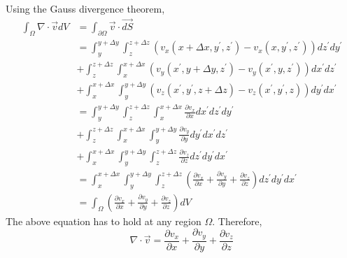 \documentclass[letterpaper, 12pt]{article}
\theoremstyle{custom}
\begin{document}
Using the Gauss divergence theorem,
\begin{align*}
  \int_{\Omega} \nabla \cdot \vec{v} dV 
  &= \int_{\partial \Omega} \vec{v} \cdot \vec{dS}\\
  &= \int_{y}^{y+\Delta y} \int_{z}^{z+\Delta z} \left( v_x (x+\Delta x, y^{\prime}, z^{\prime}) - v_x (x, y^{\prime}, z^{\prime}) \right) dz^{\prime} dy^{\prime}\\
  &+ \int_{z}^{z+\Delta z} \int_{x}^{x+\Delta x} \left( v_y (x^{\prime}, y+\Delta y, z^{\prime}) - v_y (x^{\prime}, y, z^{\prime}) \right) dx^{\prime} dz^{\prime}\\
  &+ \int_{x}^{x+\Delta x} \int_{y}^{y+\Delta y} \left( v_z (x^{\prime}, y^{\prime}, z+\Delta z) - v_z (x^{\prime}, y^{\prime}, z) \right) dy^{\prime} dx^{\prime}\\
  &= \int_{y}^{y+\Delta y} \int_{z}^{z+\Delta z} \int_{x}^{x+\Delta x} \frac{\partial v_x}{\partial x} dx^{\prime} dz^{\prime} dy^{\prime}\\
  &+ \int_{z}^{z+\Delta z} \int_{x}^{x+\Delta x} \int_{y}^{y+\Delta y} \frac{\partial v_y}{\partial y} dy^{\prime} dx^{\prime} dz^{\prime}\\
  &+ \int_{x}^{x+\Delta x} \int_{y}^{y+\Delta y} \int_{z}^{z+\Delta z} \frac{\partial v_z}{\partial z} dz^{\prime} dy^{\prime} dx^{\prime}\\
  &= \int_{x}^{x+\Delta x} \int_{y}^{y+\Delta y} \int_{z}^{z+\Delta z} \left( \frac{\partial v_x}{\partial x} + \frac{\partial v_y}{\partial y} + \frac{\partial v_z}{\partial z} \right) dz^{\prime} dy^{\prime} dx^{\prime}\\
  &= \int_{\Omega} \left( \frac{\partial v_x}{\partial x} + \frac{\partial v_y}{\partial y} + \frac{\partial v_z}{\partial z} \right) dV 
\end{align*}
The above equation has to hold at any region $\Omega$. Therefore,
\begin{equation*}
  \nabla \cdot \vec{v} = \frac{\partial v_x}{\partial x} + \frac{\partial v_y}{\partial y} + \frac{\partial v_z}{\partial z}
\end{equation*}


\bigskip
\end{document}
